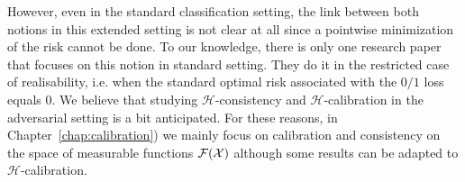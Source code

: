 However, even in the standard classification setting, the link between both notions in this extended setting is not clear at all since a pointwise minimization of the risk cannot be done. To our knowledge, there is only one research paper~\citep{long2013consistency} that focuses on this notion in standard setting. They do it in the restricted case of realisability, i.e. when the standard optimal risk associated with the $0/1$ loss equals $0$.  We believe that studying  $\mathcal{H}$-consistency and  $\mathcal{H}$-calibration in the adversarial setting is a bit anticipated. For these reasons, in Chapter~\ref{chap:calibration}) we mainly focus on calibration and consistency on the space of measurable functions $\mathcal{F}(\mathcal{X})$ although some results can be adapted to $\mathcal{H}$-calibration. 








